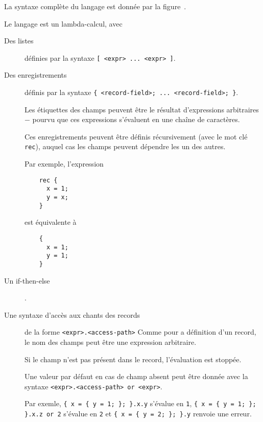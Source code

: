 La syntaxe complète du langage est donnée par la figure .

Le langage est un lambda-calcul, avec

\begin{description}
  \item[Des listes] définies par la syntaxe \lstinline{[ <expr> ... <expr> ]}.

  \item[Des enregistrements] définis par la syntaxe
    \lstinline|{ <record-field>; ... <record-field>; }|. %

    Les étiquettes des champs peuvent être le résultat d'expressions
    arbitraires − pourvu que ces expressions s'évaluent en une chaîne de
    caractères.

    Ces enregistrements peuvent être définis récursivement (avec le mot clé
    \lstinline{rec}), auquel cas les champs peuvent dépendre les un des autres.

    Par exemple, l'expression

    \begin{lstlisting}
    rec {
      x = 1;
      y = x;
    }
    \end{lstlisting}
    est équivalente à
    \begin{lstlisting}
    {
      x = 1;
      y = 1;
    }
    \end{lstlisting}

  \item[Un if-then-else].

  \item[Une syntaxe d'accès aux chants des records] de la forme
    \lstinline{<expr>.<access-path>}
    Comme pour a définition d'un record, le nom des champs peut être une
    expression arbitraire.

    Si le champ n'est pas présent dans le record, l'évaluation est stoppée.

    Une valeur par défaut en cas de champ absent peut être donnée avec la
    syntaxe \lstinline{<expr>.<access-path> or <expr>}.

    Par exemle, \lstinline|{ x = { y = 1; }; }.x.y| s'évalue en \lstinline{1},
    \lstinline|{ x = { y = 1; }; }.x.z or 2| s'évalue en \lstinline{2} et
    \lstinline|{ x = { y = 2; }; }.y| renvoie une erreur.

\end{description}


